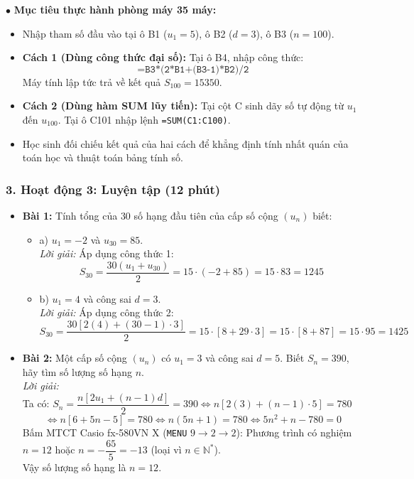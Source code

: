 \documentclass[12pt, a4paper]{article}
\begin{document}
\begin{pedabox}
    $\bullet$ \textbf{Mục tiêu thực hành phòng máy 35 máy:}
    \begin{itemize}
        \item Nhập tham số đầu vào tại ô B1 ($u_1 = 5$), ô B2 ($d = 3$), ô B3 ($n = 100$).
        \item \textbf{Cách 1 (Dùng công thức đại số):} Tại ô B4, nhập công thức:
        $$\texttt{=B3*(2*B1+(B3-1)*B2)/2}$$
        Máy tính lập tức trả về kết quả $S_{100} = 15350$.
        \item \textbf{Cách 2 (Dùng hàm SUM lũy tiến):}
        Tại cột C sinh dãy số tự động từ $u_1$ đến $u_{100}$. Tại ô C101 nhập lệnh \texttt{=SUM(C1:C100)}.
        \item Học sinh đối chiếu kết quả của hai cách để khẳng định tính nhất quán của toán học và thuật toán bảng tính số.
    \end{itemize}
\end{pedabox}


\subsubsection*{3. Hoạt động 3: Luyện tập (12 phút)}
\begin{itemize}
    \item \textbf{Bài 1:} Tính tổng của $30$ số hạng đầu tiên của cấp số cộng $(u_n)$ biết:
    \begin{itemize}
        \item a) $u_1 = -2$ và $u_{30} = 85$.\\
        \textit{Lời giải:} Áp dụng công thức 1:
        $$S_{30} = \dfrac{30(u_1 + u_{30})}{2} = 15 \cdot (-2 + 85) = 15 \cdot 83 = 1245$$
        \item b) $u_1 = 4$ và công sai $d = 3$.\\
        \textit{Lời giải:} Áp dụng công thức 2:
        $$S_{30} = \dfrac{30[2(4) + (30 - 1) \cdot 3]}{2} = 15 \cdot [8 + 29 \cdot 3] = 15 \cdot [8 + 87] = 15 \cdot 95 = 1425$$
    \end{itemize}
    \item \textbf{Bài 2:} Một cấp số cộng $(u_n)$ có $u_1 = 3$ và công sai $d = 5$. Biết $S_n = 390$, hãy tìm số lượng số hạng $n$.\\
    \textit{Lời giải:}\\
    Ta có: $S_n = \dfrac{n[2u_1 + (n - 1)d]}{2} = 390 \iff n[2(3) + (n - 1) \cdot 5] = 780$\\
    $$\iff n[6 + 5n - 5] = 780 \iff n(5n + 1) = 780 \iff 5n^2 + n - 780 = 0$$
    Bấm MTCT Casio fx-580VN X (\texttt{MENU} $9 \to 2 \to 2$):
    Phương trình có nghiệm $n = 12$ hoặc $n = -\dfrac{65}{5} = -13$ (loại vì $n \in \mathbb{N}^*$).\\
    Vậy số lượng số hạng là $n = 12$.
\end{itemize}
\end{document}
